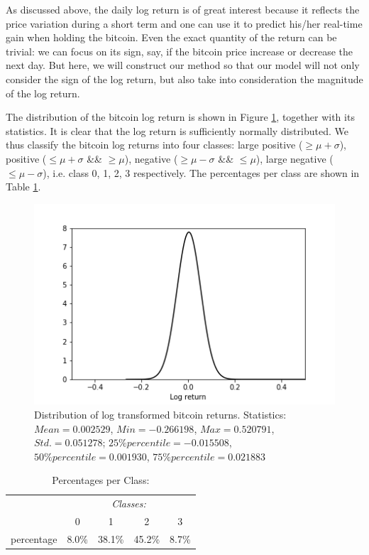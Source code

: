 \documentclass[9pt,twocolumn,twoside]{ilcss}
\begin{document}
As discussed above, the daily log return is of great interest because it reflects the price variation during a short term and one can use it to predict his/her real-time gain when holding the bitcoin. Even the exact quantity of the return can be trivial: we can focus on its sign, say, if the bitcoin price increase or decrease the next day. But here, we will construct our method so that our model will not only consider the sign of the log return, but also take into consideration the magnitude of the log return.

The distribution of the bitcoin log return is shown in Figure \ref{distribution_log_return}, together with its statistics. It is clear that the log return is sufficiently normally distributed. We thus classify the bitcoin log returns into four classes: large positive ($\geq \mu + \sigma$), positive ($\leq \mu + \sigma$ \&\& $\geq \mu$), negative ($\geq \mu - \sigma$ \&\& $\leq \mu$), large negative ($\leq \mu - \sigma$), i.e. class 0, 1, 2, 3 respectively. The percentages per class are shown in Table \ref{percent_per_class}.

\begin{figure}[h]
\centering
\includegraphics[width=.75\linewidth]{btc_ret_a.png}
\caption{Distribution of log transformed bitcoin returns. Statistics: $Mean = 0.002529$, $Min = -0.266198$, $Max = 0.520791$, $Std. = 0.051278$; $25\% percentile = -0.015508$, $50\% percentile = 0.001930$, $75\% percentile = 0.021883$}
\label{distribution_log_return}
\end{figure}

\begin{table}[h]
\centering
\caption{Percentages per Class:}
    \begin{tabular}{lcccc}
    \hline
    \hline
    & \multicolumn{4}{c}{\textit{Classes:}}\\
    \cline{2-5}
    & 0 & 1 & 2 & 3 \\
    \hline
    percentage & 8.0\% & 38.1\% & 45.2\% & 8.7\% \\
    \hline
    \end{tabular}
    \label{percent_per_class}
\end{table}
\end{document}

